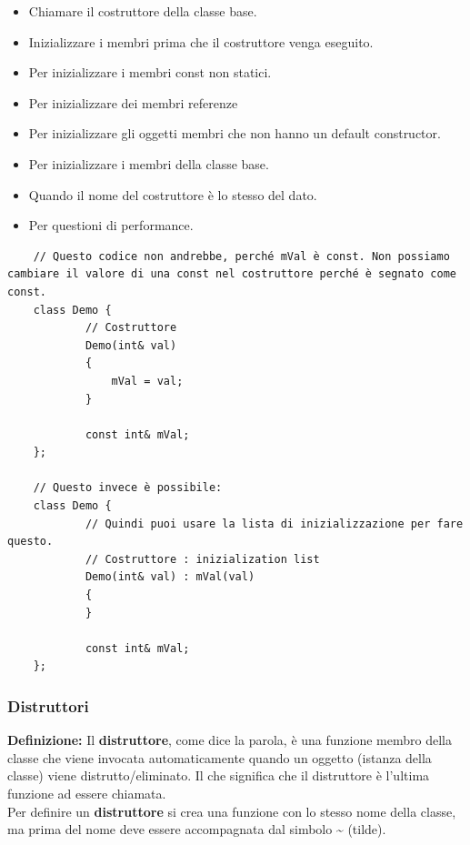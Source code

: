 \begin{itemize}
	\item \textsf{\small Chiamare il costruttore della classe base.}
	\item \textsf{\small Inizializzare i membri prima che il costruttore venga eseguito.}
	\item \textsf{\small Per inizializzare i membri const non statici.}
	\item \textsf{\small Per inizializzare dei membri referenze}
	\item \textsf{\small Per inizializzare gli oggetti membri che non hanno un default constructor.}
	\item \textsf{\small Per inizializzare i membri della classe base.}
	\item \textsf{\small Quando il nome del costruttore è lo stesso del dato.}
	\item \textsf{\small Per questioni di performance.}
\end{itemize}

\begin{lstlisting}
	// Questo codice non andrebbe, perché mVal è const. Non possiamo cambiare il valore di una const nel costruttore perché è segnato come const.
	class Demo {
			// Costruttore
			Demo(int& val)
			{
				mVal = val;
			}
		
			const int& mVal;
	};

	// Questo invece è possibile:
	class Demo {
			// Quindi puoi usare la lista di inizializzazione per fare questo.
			// Costruttore : inizialization list
			Demo(int& val) : mVal(val)
			{
			}
		
			const int& mVal;	
	};
\end{lstlisting}

\subsubsection{Distruttori}

\textsf{\small \textbf{Definizione: } Il \textbf{distruttore}, come dice la parola, è una funzione membro della classe che viene invocata automaticamente quando un oggetto (istanza della classe) viene distrutto/eliminato. Il che significa che il distruttore è l'ultima funzione ad essere chiamata. } \\

\textsf{\small Per definire un \textbf{distruttore} si crea una funzione con lo stesso nome della classe, ma prima del nome deve essere accompagnata dal simbolo \textbf{\textasciitilde} (tilde).} \\

